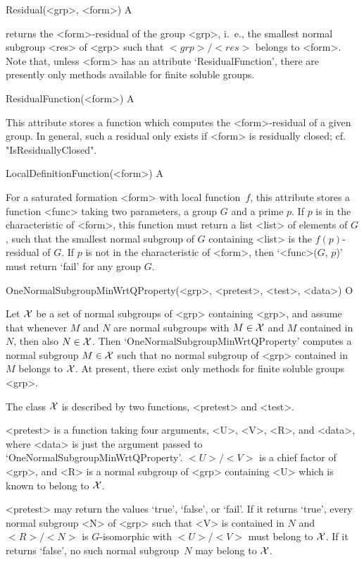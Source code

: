 \>Residual(<grp>, <form>) A

returns the <form>-residual of the group <grp>, i.~e., the smallest
normal subgroup <res> of <grp> such that $<grp>/<res>$ belongs to <form>.
Note that, unless <form>
has an attribute `ResidualFunction', there are presently only methods
available for finite soluble groups.

\>ResidualFunction(<form>) A

This attribute stores a function which computes the <form>-residual of a
given group. In general, such a residual only exists if <form> is
residually closed; cf. "IsResiduallyClosed". 

\>LocalDefinitionFunction(<form>) A

For a saturated formation <form> with local function~$f$, this attribute
stores a function <func> taking two parameters, a group
$G$ and a prime $p$. If $p$ is in the characteristic of <form>, this
function must return a list <list> of elements of
$G$, such that the smallest normal subgroup of $G$ containing <list> is the
$f(p)$-residual of $G$. If $p$ is not in the characteristic of <form>, 
then `<func>($G$, $p$)' must return `fail' for any group $G$. 



\>OneNormalSubgroupMinWrtQProperty(<grp>, <pretest>, <test>, <data>) O

Let $\cal X$ be a set of normal subgroups of <grp> containing <grp>, and
assume that whenever
$M$ and $N$ are normal subgroups with $M \in \cal X$ and $M$
contained in $N$, then also $N \in \cal X$. Then
`OneNormalSubgroupMinWrtQProperty' computes a normal subgroup $M \in \cal X$
such that no normal subgroup of <grp> contained in $M$ belongs to $\cal X$. 
At present, there exist only methods for finite soluble groups <grp>.


The class $\cal X$ is described by two functions, <pretest> and <test>. 

<pretest> is a function taking four arguments, <U>, <V>, <R>, and <data>,
where <data> is just the argument passed to
`OneNormalSubgroupMinWrtQProperty'. $<U>/<V>$ is a chief factor of <grp>,
and  <R> is a normal subgroup of <grp> containing <U> which is known to
belong to
$\cal X$.

<pretest> may return the values `true', `false', or `fail'. If it returns 
`true', every normal subgroup <N> of <grp> such that <V> is
contained in $N$ and $<R>/<N>$ is
$G$-isomorphic with $<U>/<V>$ must belong to $\cal X$. If it returns
`false', no such normal subgroup~$N$ may belong to $\cal X$. 

